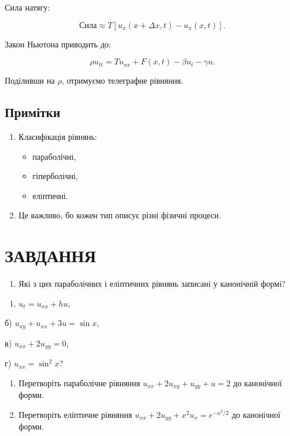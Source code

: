 \documentclass[
  ukrainian,
]{article}
\providecommand{\tightlist}{%
  \setlength{\itemsep}{0pt}\setlength{\parskip}{0pt}}
\begin{document}
Сила натягу:

\[
\text{Сила} \approx T \left[ u_x(x + \Delta x, t) - u_x(x, t) \right].
\]

Закон Ньютона приводить до:

\[
\rho u_{tt} = T u_{xx} + F(x,t) - \beta u_t - \gamma u.
\]

Поділивши на \(\rho\), отримуємо телеграфне рівняння.

\subsection{Примітки}\label{ux43fux440ux438ux43cux456ux442ux43aux438-2}

\begin{enumerate}
\def\labelenumi{\arabic{enumi}.}
\tightlist
\item
  Класифікація рівнянь:

  \begin{itemize}
  \tightlist
  \item
    параболічні,
  \item
    гіперболічні,
  \item
    еліптичні.
  \end{itemize}
\item
  Це важливо, бо кожен тип описує різні фізичні процеси.
\end{enumerate}

\section{ЗАВДАННЯ}\label{ux437ux430ux432ux434ux430ux43dux43dux44f-10}

\begin{enumerate}
\def\labelenumi{\arabic{enumi}.}
\tightlist
\item
  Які з цих параболічних і еліптичних рівнянь записані у канонічній
  формі?
\end{enumerate}

\begin{enumerate}
\def\labelenumi{\alph{enumi})}
\tightlist
\item
  \(u_t = u_{xx} + hu\),
\end{enumerate}

б) \(u_{xy} + u_{xx} + 3u = \sin x\),

в) \(u_{xx} + 2u_{yy} = 0\),

г) \(u_{xx} = \sin^2 x\)?

\begin{enumerate}
\def\labelenumi{\arabic{enumi}.}
\setcounter{enumi}{1}
\item
  Перетворіть параболічне рівняння \(u_{xx} + 2u_{xy} + u_{yy} + u = 2\)
  до канонічної форми.
\item
  Перетворіть еліптичне рівняння
  \(u_{xx} + 2u_{yy} + x^2 u_x = e^{-x^2/2}\) до канонічної форми.
\end{enumerate}
\end{document}
